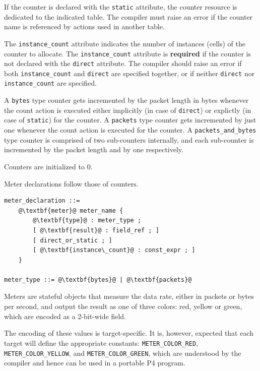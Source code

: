 \documentclass[12pt]{article}
\begin{document}
If the counter is declared with the \texttt{static} attribute, the
counter resource is dedicated to the indicated table. The compiler
must raise an error if the counter name is referenced by actions used
in another table.

The \texttt{instance_count} attribute indicates the number of
instances (cells) of the counter to allocate. The
\texttt{instance_count} attribute is \textbf{required} if the counter
is not declared with the \texttt{direct} attribute.  The compiler
should raise an error if both \texttt{instance_count} and
\texttt{direct} are specified together, or if neither \texttt{direct}
nor \texttt{instance_count} are specified.

A \texttt{bytes} type counter gets incremented by the packet length in bytes
whenever the count action is executed either implicitly (in case of
\texttt{direct}) or explictly (in case of \texttt{static}) for the counter.
A \texttt{packets} type counter gets incremented by just one whenever
the count action is executed for the counter.
A \texttt{packets_and_bytes} type counter is comprised of two sub-counters
internally, and each sub-counter is incremented by the packet length and
by one respectively.

Counters are initialized to 0.


Meter declarations follow those of counters.

\begin{lstlisting}[frame=single,backgroundcolor=\color{bnfgreen},escapechar=\@]
meter_declaration ::=
    @\textbf{meter}@ meter_name {
        @\textbf{type}@ : meter_type ;
        [ @\textbf{result}@ : field_ref ; ]
        [ direct_or_static ; ]
        [ @\textbf{instance\_count}@ : const_expr ; ]
    }

meter_type ::= @\textbf{bytes}@ | @\textbf{packets}@
\end{lstlisting}

Meters are stateful objects that measure the data rate, either in
packets or bytes per second, and output the result as one of three
colors: red, yellow or green, which are encoded as a 2-bit-wide field.

The encoding of these values is target-specific. It is, however,
expected that each target will define the appropriate constants:
\texttt{METER_COLOR_RED}, \texttt{METER_COLOR_YELLOW},
and \texttt{METER_COLOR_GREEN}, which are understood by the compiler
and hence can be used in a portable P4 program.
\end{document}
